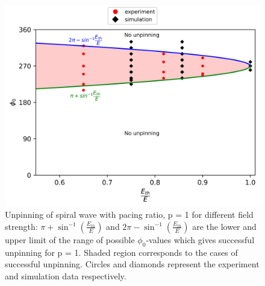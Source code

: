 %
\begin{figure}[htb!]
    \centering
    \includegraphics{p1.png}
    \caption{Unpinning of spiral wave with pacing ratio, p = 1 for different
	field strength: $\pi+{\sin^{-1}}{(\frac{E_{th}}{E})}$ and
	$2\pi-{\sin^{-1}}{(\frac{E_{th}}{E})}$ are the lower and upper limit of
	the range of possible ${\phi}_0$-values which gives successful
	unpinning for p = 1. Shaded region corresponds to the cases of
	successful unpinning.
    Circles and diamonds represent the experiment and simulation data
	respectively.} 
	\label{fig:unpinning_p1}
\end{figure}




